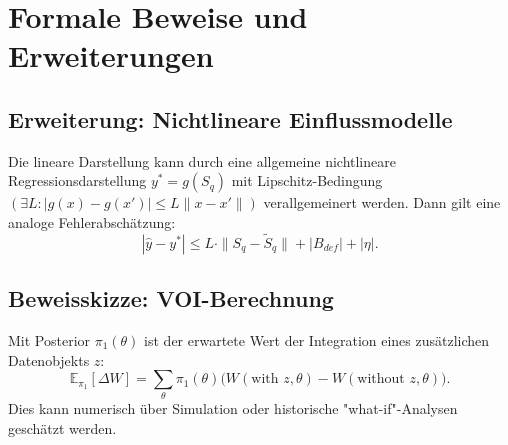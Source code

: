 \documentclass[a4paper,12pt,twoside]{report}
\theoremstyle{definition}
\newcommand{\E}{\mathbb{E}}
\begin{document}
\chapter{Formale Beweise und Erweiterungen}
\section{Erweiterung: Nichtlineare Einflussmodelle}
Die lineare Darstellung kann durch eine allgemeine nichtlineare Regressionsdarstellung $y^*=g(S_q)$ mit Lipschitz-Bedingung $(\exists L: |g(x)-g(x')|\le L\|x-x'\|)$ verallgemeinert werden. Dann gilt eine analoge Fehlerabschätzung:
\[
|\hat y-y^*| \le L\cdot \|S_q-\tilde S_q\| + |B_{def}| + |\eta|.
\]

\section{Beweisskizze: VOI-Berechnung}
Mit Posterior $\pi_1(\theta)$ ist der erwartete Wert der Integration eines zusätzlichen Datenobjekts $z$:
\[
\E_{\pi_1}[\Delta W] = \sum_{\theta} \pi_1(\theta) \big( W(\text{with }z,\theta)-W(\text{without }z,\theta)\big).
\]
Dies kann numerisch über Simulation oder historische "what-if"-Analysen geschätzt werden.
\end{document}
